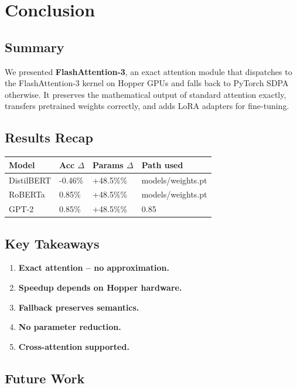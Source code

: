 \section{Conclusion}

\subsection{Summary}

We presented \textbf{FlashAttention-3}, an exact attention module that dispatches 
to the FlashAttention-3 kernel on Hopper GPUs and falls back to PyTorch 
SDPA otherwise. It preserves the mathematical output of standard attention 
exactly, transfers pretrained weights correctly, and adds LoRA adapters for 
fine-tuning.

\subsection{Results Recap}

\begin{table}[H]
\centering
\small
\begin{tabular}{llll}
\toprule
\textbf{Model} & \textbf{Acc $\Delta$} & \textbf{Params $\Delta$} & \textbf{Path used} \\
\midrule
DistilBERT & -0.46\% & +48.5\%\% & models/weights.pt \\
RoBERTa & 0.85\% & +48.5\%\% & models/weights.pt \\
GPT-2 & 0.85\% & +48.5\%\% & 0.85 \\
\bottomrule
\end{tabular}
\end{table}

\subsection{Key Takeaways}

\begin{enumerate}
\item \textbf{Exact attention -- no approximation.}
\item \textbf{Speedup depends on Hopper hardware.}
\item \textbf{Fallback preserves semantics.}
\item \textbf{No parameter reduction.}
\item \textbf{Cross-attention supported.}

\end{enumerate}
\subsection{Future Work}


